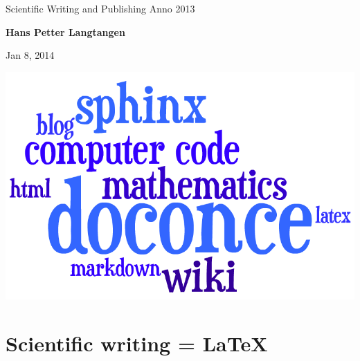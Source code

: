 \documentclass[%
twoside,                 %
final,                   %
chapterprefix=true,      %
open=right               %
10pt]{book}
\newcounter{doconce:movie:counter}
\newcounter{doconce:exercise:counter}
\begin{document}





\thispagestyle{empty}

\begin{center}
{\LARGE\bf
\begin{spacing}{1.25}
Scientific Writing and Publishing Anno 2013
\end{spacing}
}
\end{center}


\begin{center}
{\bf Hans Petter Langtangen${}^{}$} \\ [0mm]
\end{center}

\begin{center}
\end{center}


\begin{center}
Jan 8, 2014
\end{center}

\vspace{1cm}



\begin{center}  %
  \centerline{\includegraphics[width=0.5\linewidth]{fig/doconce1b.png}}
\end{center}



\section*{Scientific writing = {\LaTeX}}
\end{document}
